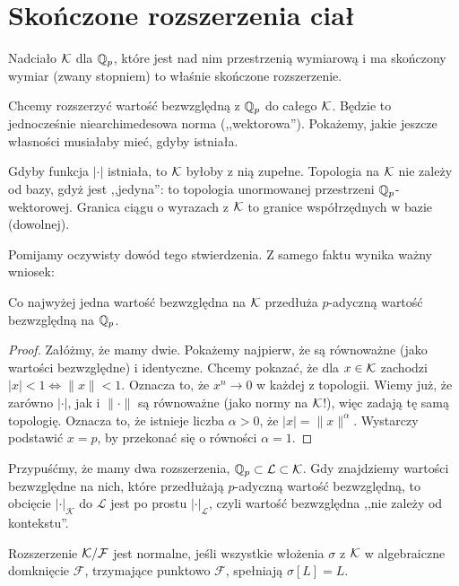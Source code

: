 \section{Skończone rozszerzenia ciał}
Nadciało $\mathcal K$ dla $\mathbb Q_p$, które jest nad nim przestrzenią wymiarową i ma skończony wymiar (zwany stopniem) to właśnie skończone rozszerzenie.

Chcemy rozszerzyć wartość bezwzględną z $\mathbb Q_p$ do całego $\mathcal K$.
Będzie to jednocześnie niearchimedesowa norma (,,wektorowa'').
Pokażemy, jakie jeszcze własności musiałaby mieć, gdyby istniała.

\begin{fakt}
	Gdyby funkcja $|\cdot|$ istniała, to $\mathcal K$ byłoby z nią zupełne.
	Topologia na $\mathcal K$ nie zależy od bazy, gdyż jest ,,jedyna'': to topologia unormowanej przestrzeni $\mathbb Q_p$-wektorowej.
	Granica ciągu o wyrazach z $\mathcal K$ to granice współrzędnych w bazie (dowolnej).
\end{fakt}

Pomijamy oczywisty dowód tego stwierdzenia.
Z samego faktu wynika ważny wniosek:

\begin{fakt}
	Co najwyżej jedna wartość bezwzględna na $\mathcal K$ przedłuża $p$-adyczną wartość bezwzględną na $\mathbb Q_p$.
\end{fakt}

\begin{proof}
	Załóżmy, że mamy dwie.
	Pokażemy najpierw, że są równoważne (jako wartości bezwzględne) i identyczne.
	Chcemy pokazać, że dla $x\in \mathcal K$ zachodzi $|x|<1 \Leftrightarrow \|x\|<1$.
	Oznacza to, że $x^n \to 0$ w każdej z topologii.
	Wiemy już, że zarówno $|\cdot|$, jak i $\|\cdot\|$ są równoważne (jako normy na $\mathcal K$!), więc zadają tę samą topologię.
	Oznacza to, że istnieje liczba $\alpha > 0$, że $|x| = \|x\|^\alpha$.
	Wystarczy podstawić $x = p$, by przekonać się o równości $\alpha = 1$.
\end{proof}

Przypuśćmy, że mamy dwa rozszerzenia, $\mathbb Q_p \subset\mathcal  L \subset \mathcal K$.
Gdy znajdziemy wartości bezwzględne na nich, które przedłużają $p$-adyczną wartość bezwzględną, to obcięcie $|\cdot|_{\mathcal  K}$ do $\mathcal L$ jest po prostu $|\cdot|_{\mathcal L}$, czyli wartość bezwzględna ,,nie zależy od kontekstu''.

\begin{definicja}
	Rozszerzenie $\mathcal K / \mathcal F$ jest normalne, jeśli wszystkie włożenia $\sigma$ z $\mathcal K$ w algebraiczne domknięcie $\mathcal F$, trzymające punktowo $\mathcal F$, spełniają $\sigma[L] = L$.
\end{definicja}

